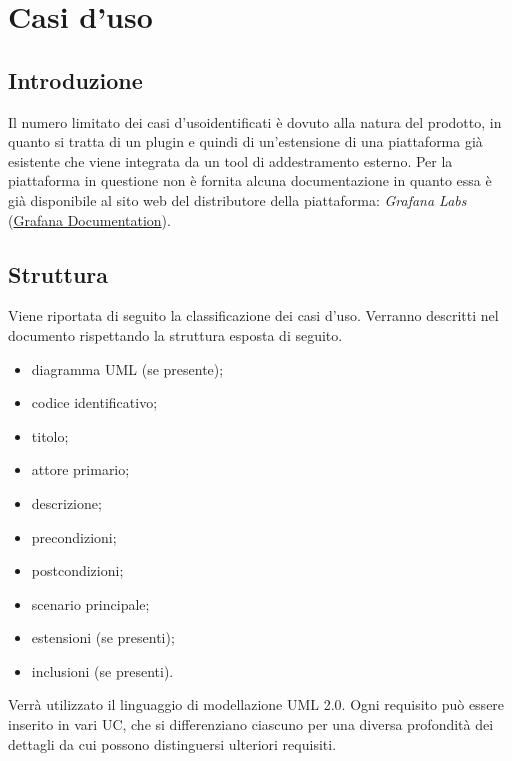 \section{Casi d'uso}

	\subsection{Introduzione}
Il numero limitato dei casi d'uso\glo identificati è dovuto alla natura del prodotto, in quanto si tratta di un plugin e quindi di un'estensione di una piattaforma già esistente che viene integrata da un tool di addestramento esterno.
Per la piattaforma in questione non è fornita alcuna documentazione in quanto essa è già disponibile al sito web del distributore della piattaforma: \emph{Grafana Labs} (\href{https://grafana.com/docs/grafana/latest/}{Grafana Documentation}).

	\subsection{Struttura}
Viene riportata di seguito la classificazione dei casi d'uso. Verranno descritti nel documento rispettando la struttura esposta di seguito.
		\begin{itemize}
			\item diagramma UML (se presente);
			\item codice identificativo;
			\item titolo;
			\item attore primario;
			\item descrizione;
			\item precondizioni;
			\item postcondizioni;
			\item scenario principale;
			\item estensioni (se presenti);
			\item inclusioni (se presenti).
		\end{itemize}
Verrà utilizzato il linguaggio di modellazione UML 2.0\glo.
Ogni requisito può essere inserito in vari UC\glo, che si differenziano ciascuno per una diversa profondità dei dettagli da cui possono distinguersi ulteriori requisiti.

